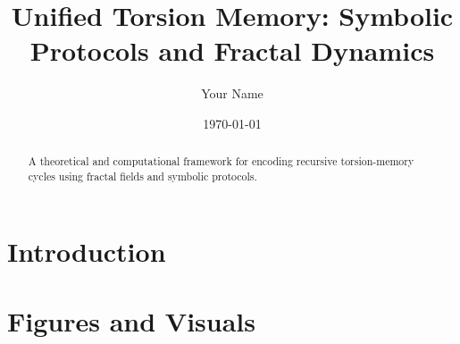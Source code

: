 \documentclass{article}
\title{Unified Torsion Memory: Symbolic Protocols and Fractal Dynamics}
\author{Your Name}
\date{\today}
\begin{document}
\maketitle

\begin{abstract}
A theoretical and computational framework for encoding recursive torsion-memory cycles using fractal fields and symbolic protocols.
\end{abstract}



\section{Introduction}

\section{Figures and Visuals}
\end{document}
